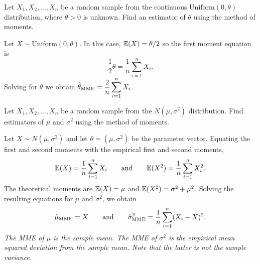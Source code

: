 \begin{example}
Let $X_1,X_2,\ldots,X_n$ be a random sample from the continuous $\text{Uniform}(0,\theta)$ distribution, where $\theta>0$ is unknown. Find an estimator of $\theta$ using the method of moments.
\begin{solution}
Let $X\sim\text{Uniform}(0,\theta)$. In this case, $\mathbb{E}(X) = \theta/2$ so the first moment equation is
\[
\frac{1}{2}\theta = \frac{1}{n}\sum_{i=1}^n X_i.
\]
Solving for $\theta$ we obtain $\hat{\theta}_{\text{\scriptsize{MME}}} = \displaystyle\frac{2}{n}\sum_{i=1}^n X_i$.
\end{solution}
\end{example}

\begin{example}
Let $X_1,X_2,\ldots,X_n$ be a random sample from the $N(\mu,\sigma^2)$ distribution. Find estimators of $\mu$ and $\sigma^2$ using the method of moments.
\end{example}

\begin{solution}
Let $X\sim N(\mu,\sigma^2)$ and let $\theta=(\mu,\sigma^2)$ be the parameter vector. Equating the first and second moments with the empirical first and second moments,
\[
\mathbb{E}(X)	= \frac{1}{n}\sum_{i=1}^n X_i
\qquad\text{and}\qquad
\mathbb{E}(X^2)	= \frac{1}{n}\sum_{i=1}^n X_i^2.
\]
The theoretical moments are $\mathbb{E}(X) = \mu$ and $\mathbb{E}(X^2) = \sigma^2 + \mu^2$. Solving the resulting equations for $\mu$ and $\sigma^2$, we obtain %
\[
\hat{\mu}_{\text{\scriptsize{MME}}}	= \bar{X}
\qquad\text{and}\qquad
\hat{\sigma}^2_{\text{\scriptsize{MME}}}	
= \frac{1}{n}\sum_{i=1}^n (X_i-\bar{X})^2.
\]
\bit
\it The MME of $\mu$ is the \emph{sample mean}.
\it The MME of $\sigma^2$ is the \emph{empirical mean squared deviation from the sample mean}. 
\eit
Note that the latter is \emph{not} the sample variance.
\end{solution}

